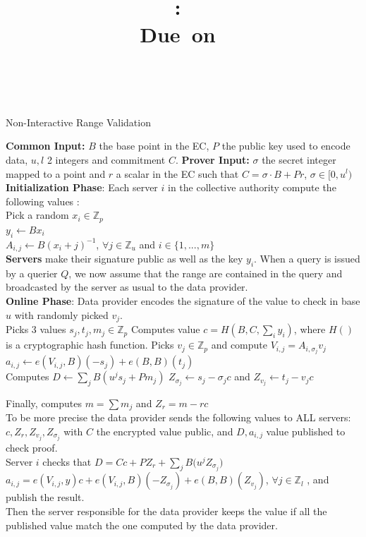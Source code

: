 \documentclass{article}
\title{
\logoepfl
\vspace{2in}
\textmd{\textbf{\hmwkClass:\ \hmwkTitle}}\\
\normalsize\vspace{0.1in}\small{Due\ on\ \hmwkDueDate}\\
\vspace{0.1in}\large{\textit{\hmwkClassInstructor\ \hmwkClassTime}}
\author{\textbf{\hmwkAuthorName}}
\vspace{3in}
}
\begin{document}
\maketitle

\newpage
\begin{algorithm}[H]
\caption{Non-Interactive Range Validation}\label{euclid}
\begin{algorithmic}[1]
\State \textbf{Common Input:} $B$ the base point in the EC, $P$ the public key used to encode data, $u, l$ 2 integers and commitment $C$.
\State \textbf{Prover Input:} $\sigma$ the secret integer mapped to a point and $r$ a scalar in the EC such that $C = \sigma \cdot B + Pr$, $\sigma \in [0,u^l)$\\

\State \textbf{Initialization Phase}: Each server $i$ in the collective authority compute the following values :\\
Pick a random $x_i \in \mathbb{Z}_p$\\
$y_i \gets Bx_i$\\
$A_{i,j} \gets B(x_i + j)^{-1} $, $\forall j \in \mathbb{Z}_u$ and $i \in \{1,...,m\}$\\
\State  \textbf{Servers} make their signature public as well as the key $y_i$. When a query is issued by a querier $Q$, we now assume that the range are contained in the query and broadcasted by the server as usual to the data provider.\\

\State \textbf{Online Phase}: Data provider encodes the signature of the value to check in base $u$ with randomly picked $v_j$.\\
\State Picks 3 values $s_j,t_j,m_j \in \mathbb{Z}_p $
\State Computes value $c = H(B,C,\sum_i{y_i})$, where $H()$ is a cryptographic hash function.
\State Picks $v_j \in \mathbb{Z}_p$ and compute $V_{i,j} = A_{i,\sigma_j}v_j$
\State $a_{i,j} \gets e(V_{i,j},B)(-s_j)+e(B,B)(t_j)$\\
\EndFor
\State Computes $D \gets \sum_{j}{B(u^j s_j + Pm_j)}$
\State $Z_{\sigma_j} \gets s_j-\sigma_j c$ and $Z_{v_j} \gets t_j-v_j c$
\EndFor

\State Finally, computes $m=\sum{m_j}$ and $Z_r = m-rc$\\

To be more precise the data provider sends the following values to ALL servers: $ c, Z_r, Z_{v_j}, Z_{\sigma_j}$ with $C$ the encrypted value public, and $D, a_{i,j}$ value published to check proof.\\

\State Server $i$ checks that $D = Cc + PZ_r + \sum_{j}{B(u^j Z_{\sigma_j}}) $\\
$a_{i,j} = e(V_{i,j},y)c + e(V_{i,j},B)(-Z_{\sigma_j}) + e(B,B)(Z_{v_j})$, $\forall j \in \mathbb{Z}_l$ , and publish the result.\\

Then the server responsible for the data provider keeps the value if all the published value match the one computed by the data provider.
\end{algorithmic}
\end{algorithm}
\end{document}
